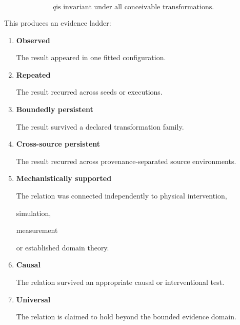 \documentclass[11pt,a4paper,oneside]{report}
\providecommand{\term}[1]{\textbf{#1}}
\begin{document}
\begin{equation}
q
\text{is invariant under all conceivable transformations.}
\end{equation}



This produces an evidence ladder:



\begin{enumerate}



\item

\term{Observed}



The result appeared in one fitted configuration.



\item

\term{Repeated}



The result recurred across seeds or executions.



\item

\term{Boundedly persistent}



The result survived a declared transformation family.



\item

\term{Cross-source persistent}



The result recurred across provenance-separated source environments.



\item

\term{Mechanistically supported}



The relation was connected independently to physical intervention,

simulation,

measurement

or established domain theory.



\item

\term{Causal}



The relation survived an appropriate causal or interventional test.



\item

\term{Universal}



The relation is claimed to hold beyond the bounded evidence domain.



\end{enumerate}
\end{document}
